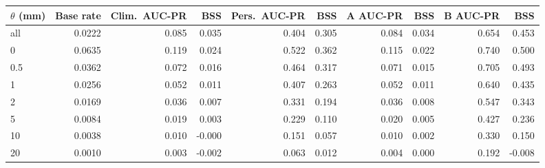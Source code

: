 \begin{tabular}{lrrrrrrrrr}
\toprule
$\theta$ (mm) & Base rate & Clim.\ AUC-PR & BSS & Pers.\ AUC-PR & BSS & A AUC-PR & BSS & B AUC-PR & BSS \\
\midrule
all & 0.0222 & 0.085 & 0.035 & 0.404 & 0.305 & 0.084 & 0.034 & 0.654 & 0.453 \\
0 & 0.0635 & 0.119 & 0.024 & 0.522 & 0.362 & 0.115 & 0.022 & 0.740 & 0.500 \\
0.5 & 0.0362 & 0.072 & 0.016 & 0.464 & 0.317 & 0.071 & 0.015 & 0.705 & 0.493 \\
1 & 0.0256 & 0.052 & 0.011 & 0.407 & 0.263 & 0.052 & 0.011 & 0.640 & 0.435 \\
2 & 0.0169 & 0.036 & 0.007 & 0.331 & 0.194 & 0.036 & 0.008 & 0.547 & 0.343 \\
5 & 0.0084 & 0.019 & 0.003 & 0.229 & 0.110 & 0.020 & 0.005 & 0.427 & 0.236 \\
10 & 0.0038 & 0.010 & -0.000 & 0.151 & 0.057 & 0.010 & 0.002 & 0.330 & 0.150 \\
20 & 0.0010 & 0.003 & -0.002 & 0.063 & 0.012 & 0.004 & 0.000 & 0.192 & -0.008 \\
\bottomrule
\end{tabular}
